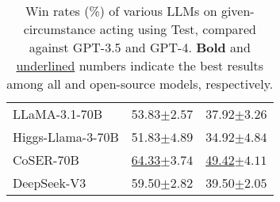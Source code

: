\begin{table}[htbp]
{\begin{tabular}{lcc}
LLaMA-3.1-70B & 53.83\scriptsize{$\pm2.57$} & 37.92\scriptsize{$\pm3.26$} \\
Higgs-Llama-3-70B & 51.83\scriptsize{$\pm4.89$} & 34.92\scriptsize{$\pm4.84$} \\
CoSER-70B & \underline{64.33\scriptsize{$\pm3.74$}} & \underline{49.42\scriptsize{$\pm4.11$}} \\
DeepSeek-V3 & 59.50\scriptsize{$\pm2.82$} & 39.50\scriptsize{$\pm2.05$} \\
\bottomrule
\end{tabular}}
\caption{Win rates (\%) of various LLMs on given-circumstance acting using \method Test, compared against GPT-3.5 and GPT-4. \textbf{Bold} and \underline{underlined} numbers indicate the best results among all and open-source models, respectively.}
\label{tab:model-comparison-wr}
\end{table}
